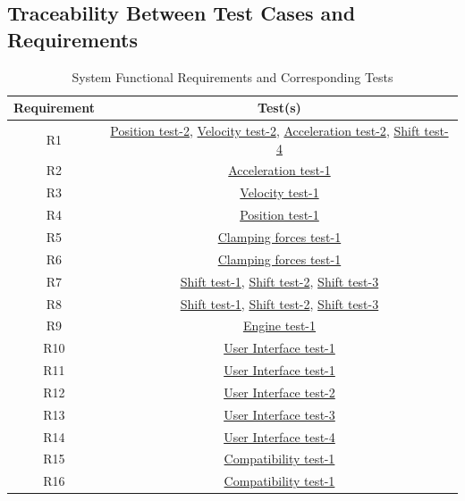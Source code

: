 \documentclass[12pt, titlepage]{article}
\begin{document}
\subsection{Traceability Between Test Cases and Requirements}


\begin{table}[H]
\centering
  \begin{tabular}{|c|c|}
    \hline
    \textbf{Requirement} & \textbf{Test(s)} \\ \hline
    R1 & \textcolor{blue}{\hyperlink{PositionTest-2}{Position test-2}}, \textcolor{blue}{\hyperlink{Velocity test-2}{Velocity test-2}}, \textcolor{blue}{\hyperlink{Acceleration test-2}{Acceleration test-2}}, \textcolor{blue}{\hyperlink{Shift test-4}{Shift test-4}} \\ \hline
    R2 & \textcolor{blue}{\hyperlink{Acceleration test-1}{Acceleration test-1}} \\ \hline
    R3 & \textcolor{blue}{\hyperlink{Velocity test-1}{Velocity test-1}} \\ \hline
    R4 & \textcolor{blue}{\hyperlink{PositionTest-1}{Position test-1}} \\ \hline
    R5 & \textcolor{blue}{\hyperlink{Clamping forces test-1}{Clamping forces test-1}}  \\ \hline
    R6 & \textcolor{blue}{\hyperlink{Clamping forces test-1}{Clamping forces test-1}}  \\ \hline
    R7 & \textcolor{blue}{\hyperlink{Shift test-1}{Shift test-1}}, \textcolor{blue}{\hyperlink{Shift test-2}{Shift test-2}}, \textcolor{blue}{\hyperlink{Shift test-3}{Shift test-3}} \\ \hline
    R8 & \textcolor{blue}{\hyperlink{Shift test-1}{Shift test-1}}, \textcolor{blue}{\hyperlink{Shift test-2}{Shift test-2}}, \textcolor{blue}{\hyperlink{Shift test-3}{Shift test-3}} \\ \hline
    R9 & \textcolor{blue}{\hyperlink{Engine test-1}{Engine test-1}}\\ \hline
    R10 & \textcolor{blue}{\hyperlink{User Interface test-1}{User Interface test-1}} \\ \hline
    R11 & \textcolor{blue}{\hyperlink{User Interface test-1}{User Interface test-1}} \\ \hline
    R12 & \textcolor{blue}{\hyperlink{User Interface test-2}{User Interface test-2}} \\ \hline
    R13 & \textcolor{blue}{\hyperlink{User Interface test-3}{User Interface test-3}} \\ \hline
    R14 & \textcolor{blue}{\hyperlink{User Interface test-4}{User Interface test-4}} \\ \hline
    R15 & \textcolor{blue}{\hyperlink{Compatibility test-1}{Compatibility test-1}} \\ \hline
    R16 & \textcolor{blue}{\hyperlink{Compatibility test-1}{Compatibility test-1}} \\ \hline
    \end{tabular}
    \caption{System Functional Requirements and Corresponding Tests}
    \label{tab:requirements_tests}
\end{table}
\end{document}
